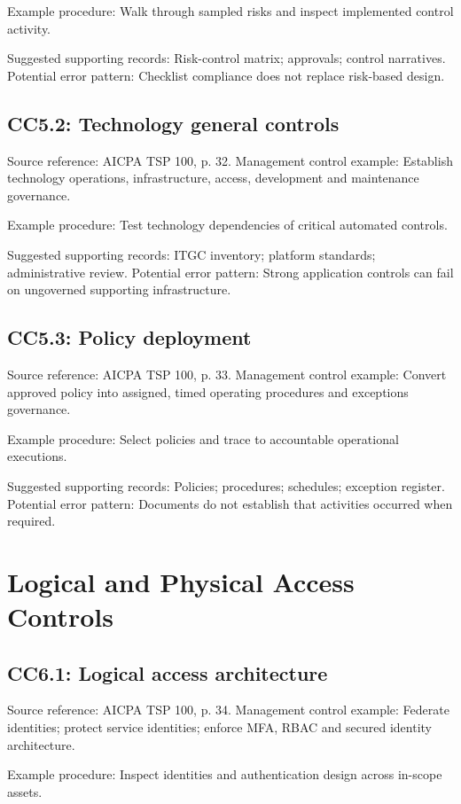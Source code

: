 \documentclass[10pt,oneside]{report}
\begin{document}
Example procedure: Walk through sampled risks and inspect implemented control activity.

Suggested supporting records: Risk-control matrix; approvals; control narratives. Potential error pattern: Checklist compliance does not replace risk-based design.

\subsection*{CC5.2: Technology general controls}
Source reference: AICPA TSP 100, p. 32. Management control example: Establish technology operations, infrastructure, access, development and maintenance governance.

Example procedure: Test technology dependencies of critical automated controls.

Suggested supporting records: ITGC inventory; platform standards; administrative review. Potential error pattern: Strong application controls can fail on ungoverned supporting infrastructure.

\subsection*{CC5.3: Policy deployment}
Source reference: AICPA TSP 100, p. 33. Management control example: Convert approved policy into assigned, timed operating procedures and exceptions governance.

Example procedure: Select policies and trace to accountable operational executions.

Suggested supporting records: Policies; procedures; schedules; exception register. Potential error pattern: Documents do not establish that activities occurred when required.

\section{Logical and Physical Access Controls}
\subsection*{CC6.1: Logical access architecture}
Source reference: AICPA TSP 100, p. 34. Management control example: Federate identities; protect service identities; enforce MFA, RBAC and secured identity architecture.

Example procedure: Inspect identities and authentication design across in-scope assets.
\end{document}
